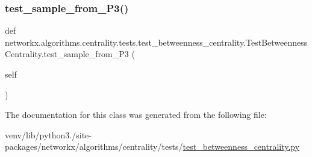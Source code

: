 \subsubsection{\texorpdfstring{test\+\_\+sample\+\_\+from\+\_\+\+P3()}{test\_sample\_from\_P3()}}
{\footnotesize\ttfamily def networkx.\+algorithms.\+centrality.\+tests.\+test\+\_\+betweenness\+\_\+centrality.\+Test\+Betweenness\+Centrality.\+test\+\_\+sample\+\_\+from\+\_\+\+P3 (\begin{DoxyParamCaption}\item[{}]{self }\end{DoxyParamCaption})}



The documentation for this class was generated from the following file\+:\begin{DoxyCompactItemize}
\item 
venv/lib/python3./site-\/packages/networkx/algorithms/centrality/tests/\hyperlink{test__betweenness__centrality_8py}{test\+\_\+betweenness\+\_\+centrality.\+py}\end{DoxyCompactItemize}
